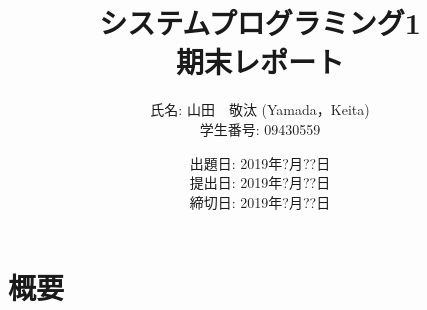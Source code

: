 \documentclass[a4j,11pt]{jarticle}
\title{システムプログラミング1 \\
       期末レポート}
\author{氏名: 山田　敬汰 (Yamada，Keita) \\
        学生番号: 09430559}
\date{出題日: 2019年?月??日 \\  %
      提出日: 2019年?月??日 \\
      締切日: 2019年?月??日 \\}  %
\begin{document}
\maketitle



\section{概要}





\end{document}
